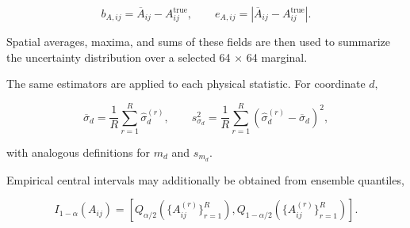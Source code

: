 \begin{equation}
\label{eq:169}
b_{A,ij}=\overline A_{ij}-A_{ij}^{\mathrm{true}},\qquad e_{A,ij}=\left|\overline A_{ij}-A_{ij}^{\mathrm{true}}\right|.
\end{equation}

Spatial averages, maxima, and sums of these fields are then used to summarize the uncertainty distribution over a selected 64 \(\times\) 64 marginal.

The same estimators are applied to each physical statistic. For coordinate \(d ,\)

\begin{equation}
\label{eq:170}
\overline\sigma_d=\frac1R\sum_{r=1}^{R}\widehat\sigma_d^{(r)},\qquad s_{\sigma_d}^{2}=\frac1R\sum_{r=1}^{R}\left(\widehat\sigma_d^{(r)}-\overline\sigma_d\right)^2,
\end{equation}

with analogous definitions for \(m_{d}\) and \(s_{m_{d}} .\)

Empirical central intervals may additionally be obtained from ensemble quantiles,

\begin{equation}
\label{eq:171}
I_{1-\alpha}(A_{ij})=\left[Q_{\alpha/2}(\{A_{ij}^{(r)}\}_{r=1}^{R}),Q_{1-\alpha/2}(\{A_{ij}^{(r)}\}_{r=1}^{R})\right].
\end{equation}

